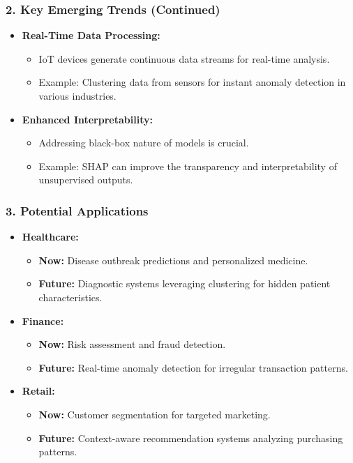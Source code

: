 \documentclass[aspectratio=169]{beamer}
\begin{document}
\begin{frame}
    \frametitle{2. Key Emerging Trends (Continued)}
    \begin{itemize}
        \item \textbf{Real-Time Data Processing:}
        \begin{itemize}
            \item IoT devices generate continuous data streams for real-time analysis.
            \item Example: Clustering data from sensors for instant anomaly detection in various industries.
        \end{itemize}

        \item \textbf{Enhanced Interpretability:}
        \begin{itemize}
            \item Addressing black-box nature of models is crucial.
            \item Example: SHAP can improve the transparency and interpretability of unsupervised outputs.
        \end{itemize}
    \end{itemize}
\end{frame}

\begin{frame}
    \frametitle{3. Potential Applications}
    \begin{itemize}
        \item \textbf{Healthcare:}
        \begin{itemize}
            \item \textbf{Now:} Disease outbreak predictions and personalized medicine.
            \item \textbf{Future:} Diagnostic systems leveraging clustering for hidden patient characteristics.
        \end{itemize}

        \item \textbf{Finance:}
        \begin{itemize}
            \item \textbf{Now:} Risk assessment and fraud detection.
            \item \textbf{Future:} Real-time anomaly detection for irregular transaction patterns.
        \end{itemize}

        \item \textbf{Retail:}
        \begin{itemize}
            \item \textbf{Now:} Customer segmentation for targeted marketing.
            \item \textbf{Future:} Context-aware recommendation systems analyzing purchasing patterns.
        \end{itemize}
    \end{itemize}
\end{frame}
\end{document}
